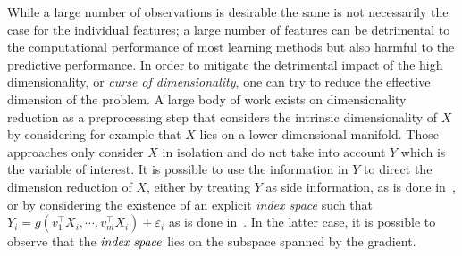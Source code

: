 While a large number of observations is desirable the same is not necessarily the case for the individual features; a large number of features can be detrimental to the computational performance of most learning methods but also harmful to the predictive performance. In order to mitigate the detrimental impact of the high dimensionality, or \emph{curse of dimensionality}, one can try to reduce the effective dimension of the problem. A large body of work exists on dimensionality reduction as a preprocessing step that considers the intrinsic dimensionality of $X$ by considering for example that $X$ lies on a lower-dimensional manifold. Those approaches only consider $X$ in isolation and do not take into account $Y$ which is the variable of interest. It is possible to use the information in $Y$ to direct the dimension reduction of $X$, either by treating $Y$ as side information, as is done in~\cite{bachPredictiveLowrankDecomposition2005}, or by considering the existence of an explicit \emph{index space} such that $Y_i = g(v_1^\intercal X_i, \cdots, v_m^\intercal X_i) + \varepsilon_i$ as is done in~\cite{dalalyanNewAlgorithmEstimating2008}. In the latter case, it is possible to observe that the $\emph{index space}$ lies on the subspace spanned by the gradient.

